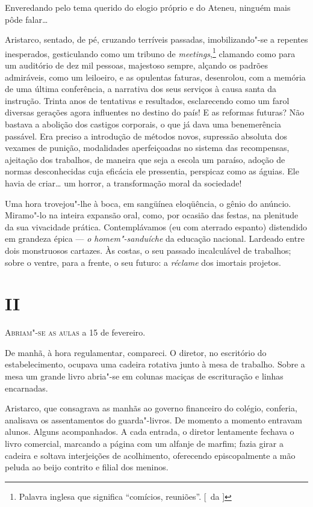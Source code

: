 Enveredando pelo tema
querido do elogio próprio e do Ateneu, ninguém mais pôde falar\ldots{}

Aristarco, sentado, de pé, cruzando terríveis passadas,
imobilizando"-se a repentes inesperados, gesticulando como um tribuno
de \textit{meetings},\footnote{ Palavra inglesa que significa 
``comícios, reuniões''. [~da ]} clamando 
como para um auditório de dez mil pessoas,
majestoso sempre, alçando os padrões admiráveis, como um leiloeiro, e
as opulentas faturas, desenrolou, com a memória de uma última
conferência, a narrativa dos seus serviços à causa santa da instrução.
Trinta anos de tentativas e resultados, esclarecendo como um farol
diversas gerações agora influentes no destino do país! E as reformas
futuras? Não bastava a abolição dos castigos corporais, o que já dava
uma benemerência passável. Era preciso a introdução de métodos novos,
supressão absoluta dos vexames de punição, modalidades aperfeiçoadas no
sistema das recompensas, ajeitação dos trabalhos, de maneira que seja a
escola um paraíso, adoção de normas desconhecidas cuja eficácia ele
pressentia, perspicaz como as águias. Ele havia de criar\ldots{} um horror,
a transformação moral da sociedade! 

Uma hora trovejou"-lhe à boca, em
sangüínea eloqüência, o gênio do anúncio. Miramo"-lo na inteira
expansão oral, como, por ocasião das festas, na plenitude da sua
vivacidade prática. Contemplávamos (eu com aterrado espanto) distendido
em grandeza épica --- \textit{o homem"-sanduíche} da educação nacional. Lardeado
entre dois monstruosos cartazes. Às costas, o seu passado incalculável
de trabalhos; sobre o ventre, para a frente, o seu futuro: a \textit{réclame}
dos imortais projetos.


\section{II}

\noindent\textsc{Abriam"-se as aulas} a 15 de fevereiro. 

De manhã, à hora regulamentar, compareci. 
O diretor, no escritório do estabelecimento, ocupava uma
cadeira rotativa junto à mesa de trabalho. Sobre a mesa um grande livro
abria"-se em colunas maciças de escrituração e linhas encarnadas.

Aristarco, que consagrava as manhãs ao governo financeiro do colégio,
conferia, analisava os assentamentos do guarda"-livros. De momento a
momento entravam alunos. Alguns acompanhados. A cada entrada, o diretor
lentamente fechava o livro comercial, marcando a página com um alfanje
de marfim; fazia girar a cadeira e soltava interjeições de acolhimento,
oferecendo episcopalmente a mão peluda ao beijo contrito e filial dos meninos. 

